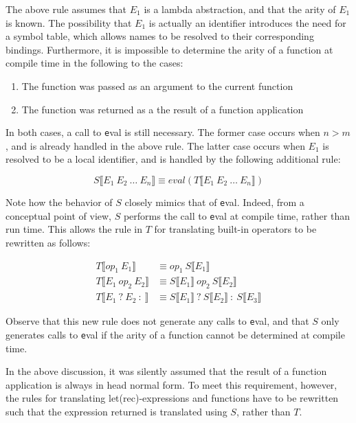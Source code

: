 The above rule assumes that $E_1$ is a lambda abstraction, and that the arity of
$E_1$ is known. The possibility that $E_1$ is actually an identifier introduces
the need for a symbol table, which allows names to be resolved to their
corresponding bindings. Furthermore, it is impossible to determine the arity of
a function at compile time in the following to the cases:

\begin{enumerate}
\item The function was passed as an argument to the current function
\item The function was returned as a the result of a function application
\end{enumerate}

In both cases, a call to {\texttt eval} is still necessary. The former case
occurs when $n > m$, and is already handled in the above rule. The latter case
occurs when $E_1$ is resolved to be a local identifier, and is handled by the
following additional rule:

\[ S \llbracket E_1 \: E_2 \: \ldots \: E_n \rrbracket \equiv
   eval(T \llbracket E_1 \: E_2 \: \ldots \: E_n \rrbracket) \]

Note how the behavior of $S$ closely mimics that of {\texttt eval}. Indeed,
from a conceptual point of view, $S$ performs the call to {\texttt eval} at
compile time, rather than run time. This allows the rule in $T$ for translating
built-in operators to be rewritten as follows:

\begin{align*}
T \llbracket op_1 \: E_1 \rrbracket &
        \equiv op_1 \: S \llbracket E_1 \rrbracket \\
T \llbracket E_1 \: op_2 \: E_2 \rrbracket &
        \equiv S \llbracket E_1 \rrbracket \: op_2 \:
               S \llbracket E_2 \rrbracket \\
T \llbracket E_1 \: ? \: E_2 \: : \: \rrbracket &
        \equiv S \llbracket E_1 \rrbracket \: ? \:
               S \llbracket E_2 \rrbracket \: : \:
               S \llbracket E_3 \rrbracket 
\end{align*}

Observe that this new rule does not generate any calls to {\texttt eval}, and
that $S$ only generates calls to {\texttt eval} if the arity of a function
cannot be determined at compile time.

In the above discussion, it was silently assumed that the result of a function
application is always in head normal form. To meet this requirement, however,
the rules for translating let(rec)-expressions and functions have to be
rewritten such that the expression returned is translated using $S$, rather than
$T$.

